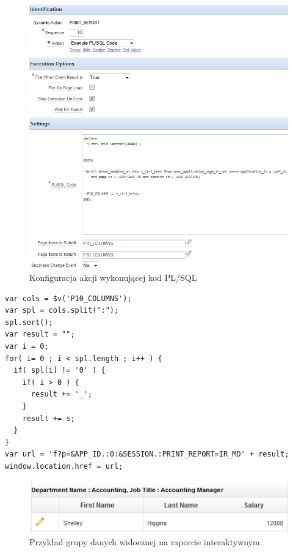 \documentclass[11pt,a4paper]{article}
\begin{document}
\begin{figure}
\centering
\includegraphics[scale=0.9]{plsql_act}
\caption{Konfiguracja akcji wykonującej kod PL/SQL}
\label{img:plsqlaction}
\end{figure}

\lstset{}
\begin{lstlisting}[frame=single,caption=Kod \emph{JavaScript} wykonywany po kliknięciu na przycisk,label=printjs]
var cols = $v('P10_COLUMNS');
var spl = cols.split(":");
spl.sort();
var result = "";
var i = 0;
for( i= 0 ; i < spl.length ; i++ ) {
  if( spl[i] != '0' ) {
    if( i > 0 ) {
      result += '_'; 
    }
    result += s;
  }
}
var url = 'f?p=&APP_ID.:0:&SESSION.:PRINT_REPORT=IR_MD' + result; 
window.location.href = url;

\end{lstlisting}



\begin{figure}[h]
\centering
\includegraphics[scale=0.8]{final_screen}
\caption{Przykład grupy danych widocznej na raporcie interaktywnym}
\label{img:final}
\end{figure}
\end{document}
